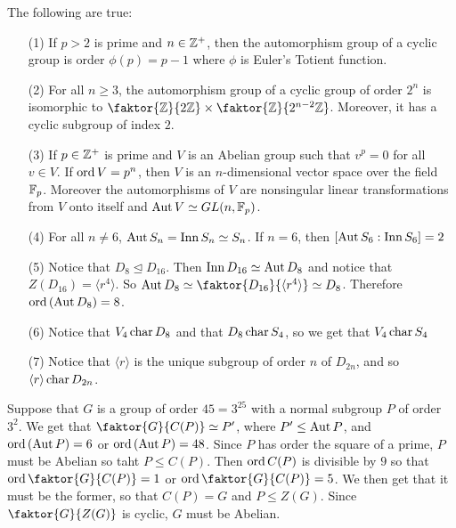 \begin{theorem}\label{theorem_4.4.6}
  The following are true:
  \begin{enumerate}
    \item[(1)] If $p>2$ is prime and $n \in \mathbb{Z}^+$, then the automorphism
      group of a cyclic group is order $\phi(p)=p-1$ where $\phi$ is
      Euler's Totient function.

    \item[(2)] For all $n \geq 3$, the automorphism group of a cyclic group
      of order  $2^n$ is isomorphic to  $\faktor{\Z}{2\Z} \times
      \faktor{\Z}{2^{n-2}\Z}$. Moreover, it has a cyclic subgroup of index
      $2$.

    \item[(3)] If $p \in \mathbb{Z}^+$ is prime and $V$ is an Abelian group such
      that  $v^p=0$ for all $v \in V$. If  $\operatorname{ord}{V}=p^n$, then $V$ is an
      $n$-dimensional vector space over the field  $\mathbb{F}_p$. Moreover the
      automorphisms of $V$ are nonsingular linear transformations from $V$
      onto itself and  $\operatorname{Aut}{V} \simeq GL(n,\mathbb{F}_p)$.

    \item[(4)] For all $n \neq 6$,  $\operatorname{Aut}{S_n}=\operatorname{Inn}{S_n} \simeq S_n$. If
      $n=6$, then $[\operatorname{Aut}{S_6}:\operatorname{Inn}{S_6}]=2$

    \item[(5)] Notice that $D_8 \unlhd D_{16}$. Then $\operatorname{Inn}{D_{16}} \simeq
      \operatorname{Aut}{D_8}$ and notice that $Z(D_{16})= \langle r^4 \rangle$. So
      $\Aut{D_8} \simeq \faktor{D_{16}}{\langle r^4 \rangle} \simeq D_8$.
      Therefore $\operatorname{ord}{{(\operatorname{Aut}{D_8})}}=8$.

    \item[(6)] Notice that $V_4 \operatorname{char} D_8$ and that $D_8 \operatorname{char} S_4$, so we
      get that $V_4 \operatorname{char} S_4$

    \item[(7)] Notice that $\langle r \rangle$ is the unique subgroup of
      order $n$ of  $D_{2n}$, and so $\langle r \rangle \operatorname{char} D_{2n}$.
  \end{enumerate}
\end{theorem}

\begin{example}\label{example_4.12}
  Suppose that $G$ is a group of order  $45=3^25$ with a normal subgroup $P$
  of order $3^2$. We get that  $\faktor{G}{C(P)} \simeq P'$, where $P' \leq
  \operatorname{Aut}{P}$, and $\operatorname{ord}{(\operatorname{Aut}{P})}=6$ or $\operatorname{ord}{(\operatorname{Aut}{P})}=48$. Since $P$ has
  order the square of a prime,  $P$ must be Abelian so taht  $P \leq C(P)$.
  Then $\operatorname{ord}{C(P)}$ is divisible by $9$ so that $\ord {\faktor{G}{C(P)}}=1$ or
  $\ord{\faktor{G}{C(P)}}=5$. We then get that it must be the former, so that
  $C(P)=G$ and $P \leq Z(G)$. Since $\faktor{G}{Z(G)}$ is cyclic, $G$ must be
  Abelian.
\end{example}

